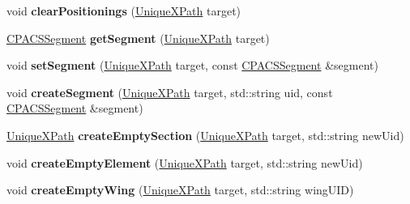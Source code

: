 \begin{DoxyCompactItemize}
\item 
\hypertarget{classcpcr_1_1CPACSFile_aa00c62ccb4ce1e97aecfde6192883e6f}{void {\bfseries clear\-Positionings} (\hyperlink{classcpcr_1_1UniqueXPath}{Unique\-X\-Path} target)}\label{classcpcr_1_1CPACSFile_aa00c62ccb4ce1e97aecfde6192883e6f}

\item 
\hypertarget{classcpcr_1_1CPACSFile_ab52989acc14cd7b9e4548d3d7eeb4653}{\hyperlink{classcpcr_1_1CPACSSegment}{C\-P\-A\-C\-S\-Segment} {\bfseries get\-Segment} (\hyperlink{classcpcr_1_1UniqueXPath}{Unique\-X\-Path} target)}\label{classcpcr_1_1CPACSFile_ab52989acc14cd7b9e4548d3d7eeb4653}

\item 
\hypertarget{classcpcr_1_1CPACSFile_ad27c26bc97ddbb9730f498ec7a1a2ead}{void {\bfseries set\-Segment} (\hyperlink{classcpcr_1_1UniqueXPath}{Unique\-X\-Path} target, const \hyperlink{classcpcr_1_1CPACSSegment}{C\-P\-A\-C\-S\-Segment} \&segment)}\label{classcpcr_1_1CPACSFile_ad27c26bc97ddbb9730f498ec7a1a2ead}

\item 
\hypertarget{classcpcr_1_1CPACSFile_a463a319b4951f1b94ce886b76fe7b246}{void {\bfseries create\-Segment} (\hyperlink{classcpcr_1_1UniqueXPath}{Unique\-X\-Path} target, std\-::string uid, const \hyperlink{classcpcr_1_1CPACSSegment}{C\-P\-A\-C\-S\-Segment} \&segment)}\label{classcpcr_1_1CPACSFile_a463a319b4951f1b94ce886b76fe7b246}

\item 
\hypertarget{classcpcr_1_1CPACSFile_a3e8f485a01c91d09a1c923491e0cc3f5}{\hyperlink{classcpcr_1_1UniqueXPath}{Unique\-X\-Path} {\bfseries create\-Empty\-Section} (\hyperlink{classcpcr_1_1UniqueXPath}{Unique\-X\-Path} target, std\-::string new\-Uid)}\label{classcpcr_1_1CPACSFile_a3e8f485a01c91d09a1c923491e0cc3f5}

\item 
\hypertarget{classcpcr_1_1CPACSFile_a0e362dce188fb837b89a76cb67591d60}{void {\bfseries create\-Empty\-Element} (\hyperlink{classcpcr_1_1UniqueXPath}{Unique\-X\-Path} target, std\-::string new\-Uid)}\label{classcpcr_1_1CPACSFile_a0e362dce188fb837b89a76cb67591d60}

\item 
\hypertarget{classcpcr_1_1CPACSFile_a3982480a78ec393cf6b327846898fbba}{void {\bfseries create\-Empty\-Wing} (\hyperlink{classcpcr_1_1UniqueXPath}{Unique\-X\-Path} target, std\-::string wing\-U\-I\-D)}\label{classcpcr_1_1CPACSFile_a3982480a78ec393cf6b327846898fbba}


\end{DoxyCompactItemize}
